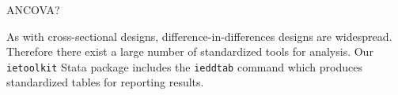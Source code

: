 ANCOVA?

As with cross-sectional designs, difference-in-differences designs are widespread.
Therefore there exist a large number of standardized tools for analysis.
Our \texttt{ietoolkit} Stata package includes the \texttt{ieddtab} command
which produces standardized tables for reporting results.

